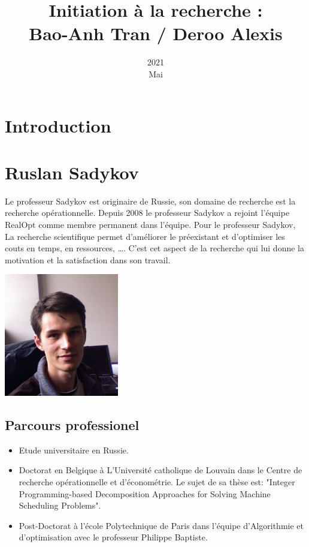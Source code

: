 \documentclass[12pt]{article}
\title{Initiation à la recherche : \\ Bao-Anh Tran / Deroo Alexis}
\date{2021\\ Mai}
\begin{document}
    \maketitle
    \newpage
    \tableofcontents
    \newpage

    \section{Introduction}\label{sec:introduction}
    
    \newpage
    \section{Ruslan Sadykov}\label{sec:le-chercheur}
    Le professeur Sadykov est originaire de Russie, son domaine de recherche est la recherche opérationnelle. Depuis
    2008 le professeur Sadykov a rejoint l'équipe RealOpt comme membre permanent dans l'équipe. Pour le professeur
    Sadykov, La recherche scientifique permet d'améliorer le préexistant et d'optimiser les couts en temps,
    en ressources, \ldots. C'est cet aspect de la recherche qui lui donne la motivation et la satisfaction dans son
    travail.

    \begin{center}
        \includegraphics[width=5cm]{image/photo1.jpg}
    \end{center}

    \subsection*{Parcours professionel}\label{subsec:parcours-professionel}

    \begin{itemize}
    \item Etude universitaire en Russie.
    \item Doctorat en Belgique à L'Université catholique de Louvain dans le Centre de recherche opérationnelle et
    d'économétrie.
    Le sujet de sa thèse est: "Integer Programming-based Decomposition Approaches for Solving Machine Scheduling Problems".
    \item Post-Doctorat à l'école Polytechnique de Paris dans l'équipe d'Algorithmie et d'optimisation avec le
    professeur Philippe Baptiste.
    \end{itemize}
\end{document}
